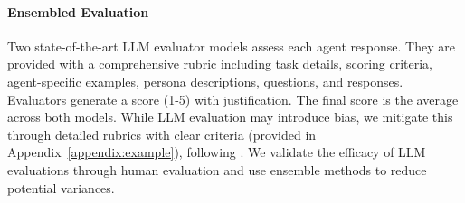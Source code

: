 \paragraph{Ensembled Evaluation} Two state-of-the-art LLM evaluator models assess each agent response. They are provided with a comprehensive rubric including task details, scoring criteria, agent-specific examples, persona descriptions, questions, and responses. Evaluators generate a score (1-5) with justification. The final score is the average across both models. While LLM evaluation may introduce bias, we mitigate this through detailed rubrics with clear criteria (provided in Appendix~\ref{appendix:example}), following \cite{liu-etal-2023-g}. We validate the efficacy of LLM evaluations through human evaluation and use ensemble methods to reduce potential variances.